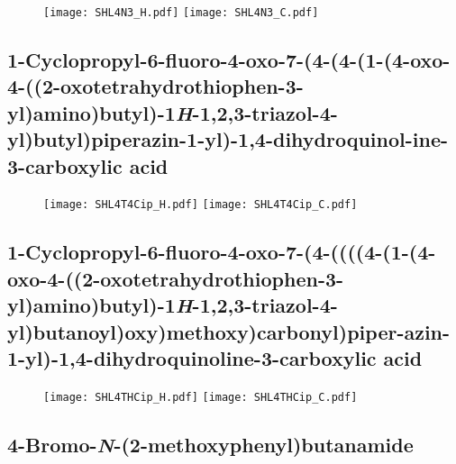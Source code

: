 \begin{figure}[H]
	\centering
		\texttt{[image: SHL4N3\_H.pdf]}
		\texttt{[image: SHL4N3\_C.pdf]}
\end{figure}



\subsection{1\hyp{}Cyclopropyl\hyp{}6\hyp{}fluoro\hyp{}4\hyp{}oxo\hyp{}7\hyp{}(4\hyp{}(4\hyp{}(1\hyp{}(4\hyp{}oxo\hyp{}4\hyp{}((2\hyp{}oxotetrahydrothiophen\hyp{}3\hyp{}yl)amino)butyl)\hyp{}1\textit{H}\hyp{}1,2,3\hyp{}triazol\hyp{}4\hyp{}yl)butyl)piperazin\hyp{}1\hyp{}yl)\hyp{}1,4\hyp{}dihydroquin\allowbreak ol\hyp{}ine\hyp{}3\hyp{}carboxylic acid }

\begin{figure}[H]
	\centering
		\texttt{[image: SHL4T4Cip\_H.pdf]}
		\texttt{[image: SHL4T4Cip\_C.pdf]}
\end{figure}

\subsection{1\hyp{}Cyclopropyl\hyp{}6\hyp{}fluoro\hyp{}4\hyp{}oxo\hyp{}7\hyp{}(4\hyp{}((((4\hyp{}(1\hyp{}(4\hyp{}oxo\hyp{}4\hyp{}((2\hyp{}oxotetrahydrothiophen\allowbreak \hyp{}3\hyp{}yl)amino)butyl)\hyp{}1\textit{H}\hyp{}1,2,3\hyp{}triazol\hyp{}4\hyp{}yl)butanoyl)oxy)methoxy)carbonyl)pip\allowbreak er\hyp{}azin\hyp{}1\hyp{}yl)\hyp{}1,4\hyp{}dihydroquinoline\hyp{}3\hyp{}carboxylic acid }

\begin{figure}[H]
	\centering
		\texttt{[image: SHL4THCip\_H.pdf]}
		\texttt{[image: SHL4THCip\_C.pdf]}
\end{figure}

\subsection{4\hyp{}Bromo\hyp{}\textit{N}\hyp{}(2\hyp{}methoxyphenyl)butanamide }

